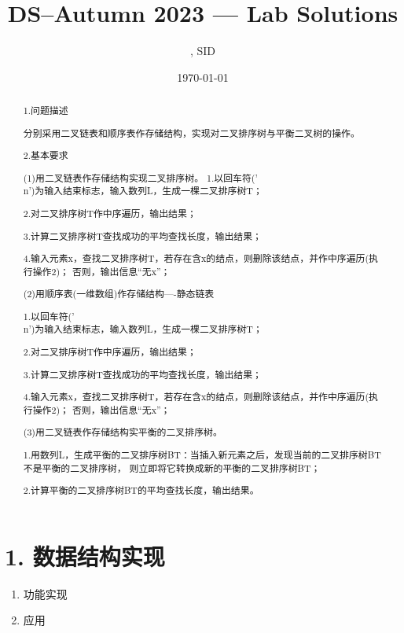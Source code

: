 \documentclass[UTF8]{ctexart}
\title{DS--Autumn 2023 --- Lab \Lab    Solutions} %
\author{\Name, SID \SID} %
\date{\today} %
\newenvironment{qparts}{\begin{enumerate}[{(}a{)}]}{\end{enumerate}} %
\begin{document}
\maketitle


\begin{abstract}
    1.问题描述
    
    分别采用二叉链表和顺序表作存储结构，实现对二叉排序树与平衡二叉树的操作。

    2.基本要求

    (1)用二叉链表作存储结构实现二叉排序树。
        1.以回车符('\\n')为输入结束标志，输入数列L，生成一棵二叉排序树T；

        2.对二叉排序树T作中序遍历，输出结果；

        3.计算二叉排序树T查找成功的平均查找长度，输出结果；

        4.输入元素x，查找二叉排序树T，若存在含x的结点，则删除该结点，并作中序遍历(执行操作2)；
        否则，输出信息“无x”；

    (2)用顺序表(一维数组)作存储结构----静态链表

        1.以回车符('\\n')为输入结束标志，输入数列L，生成一棵二叉排序树T；

        2.对二叉排序树T作中序遍历，输出结果；

        3.计算二叉排序树T查找成功的平均查找长度，输出结果；

        4.输入元素x，查找二叉排序树T，若存在含x的结点，则删除该结点，并作中序遍历(执行操作2)；
        否则，输出信息“无x”；

    (3)用二叉链表作存储结构实平衡的二叉排序树。

        1.用数列L，生成平衡的二叉排序树BT：当插入新元素之后，发现当前的二叉排序树BT不是平衡的二叉排序树，
        则立即将它转换成新的平衡的二叉排序树BT；

        2.计算平衡的二叉排序树BT的平均查找长度，输出结果。




     

\end{abstract}







\section*{1. 数据结构实现}
\begin{qparts}
    \item 功能实现


    \item 应用 
    
\end{qparts}
\end{document}
